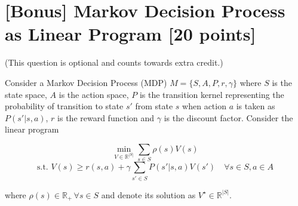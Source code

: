 \documentclass{article}
\begin{document}
\clearpage

\section{[Bonus] Markov Decision Process as Linear Program [20 points]}

(This question is optional and counts towards extra credit.)

Consider a Markov Decision Process (MDP) \( M = \{S, A, P, r, \gamma\} \) where \( S \) is the state space, \( A \) is the action space, \( P \) is the transition kernel representing the probability of transition to state \( s' \) from state \( s \) when action \( a \) is taken as \( P(s'|s, a) \), \( r \) is the reward function and \( \gamma \) is the discount factor. Consider the linear program

\[
\min_{V \in \mathbb{R}^{|S|}} \sum_{s \in S} \rho(s)V(s)
\]
\[
\text{s.t. } V(s) \geq r(s, a) + \gamma \sum_{s' \in S} P(s'|s, a)V(s') \quad \forall s \in S, a \in A
\]

where \( \rho(s) \in \mathbb{R}_+ \, \forall s \in S \) and denote its solution as \( V^\star \in \mathbb{R}^{|S|} \).
\end{document}
